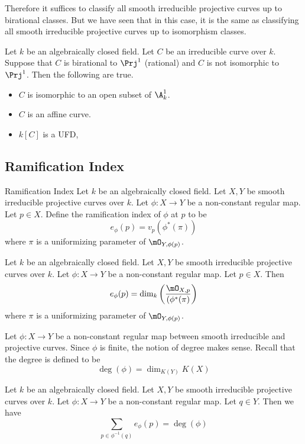 \documentclass[a4paper]{article}
\begin{document}
Therefore it suffices to classify all smooth irreducible projective curves up to birational classes. But we have seen that in this case, it is the same as classifying all smooth irreducible projective curves up to isomorphism classes. 

\begin{prp}{}{} Let $k$ be an algebraically closed field. Let $C$ be an irreducible curve over $k$. Suppose that $C$ is birational to $\Prj^1$ (rational) and $C$ is not isomorphic to $\Prj^1$. Then the following are true. 
\begin{itemize}
\item $C$ is isomorphic to an open subset of $\A_k^1$. 
\item $C$ is an affine curve. 
\item $k[C]$ is a UFD, 
\end{itemize}
\end{prp}


\subsection{Ramification Index}
\begin{defn}{Ramification Index}{} Let $k$ be an algebraically closed field. Let $X,Y$ be smooth irreducible projective curves over $k$. Let $\phi:X\to Y$ be a non-constant regular map. Let $p\in X$. Define the ramification index of $\phi$ at $p$ to be $$e_\phi(p)=v_p(\phi^\ast(\pi))$$ where $\pi$ is a uniformizing parameter of $\mO_{Y,\phi(p)}$. 
\end{defn}

\begin{lmm}{}{} Let $k$ be an algebraically closed field. Let $X,Y$ be smooth irreducible projective curves over $k$. Let $\phi:X\to Y$ be a non-constant regular map. Let $p\in X$. Then $$e_\phi(p)=\dim_k\left(\frac{\mO_{X,p}}{(\phi^\ast(\pi)}\right)$$ where $\pi$ is a uniformizing parameter of $\mO_{Y,\phi(p)}$. 
\end{lmm}

Let $\phi:X\to Y$ be a non-constant regular map between smooth irreducible and projective curves. Since $\phi$ is finite, the notion of degree makes sense. Recall that the degree is defined to be $$\deg(\phi)=\dim_{K(Y)}K(X)$$

\begin{prp}{}{} Let $k$ be an algebraically closed field. Let $X,Y$ be smooth irreducible projective curves over $k$. Let $\phi:X\to Y$ be a non-constant regular map. Let $q\in Y$. Then we have $$\sum_{p\in\phi^{-1}(q)}e_\phi(p)=\deg(\phi)$$
\end{prp}
\end{document}
